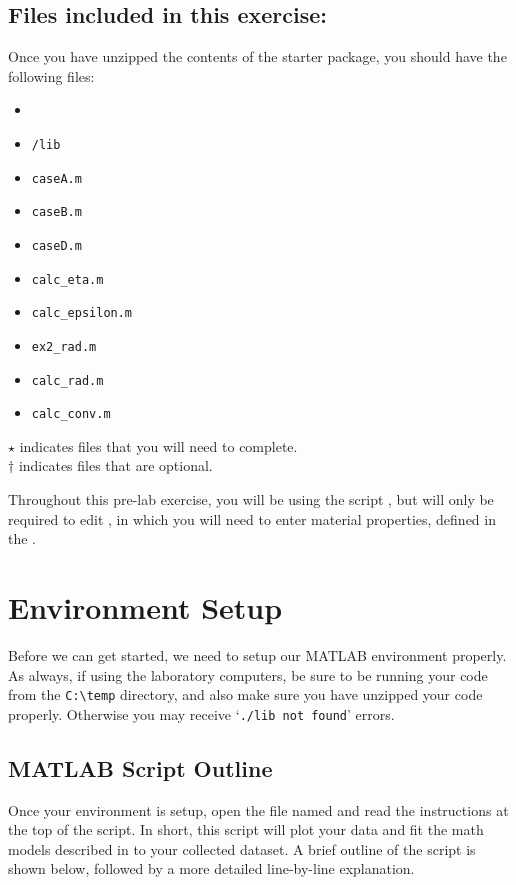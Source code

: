 \documentclass[11pt, letterpaper]{article}
\begin{document}
\subsection*{Files included in this exercise:}
Once you have unzipped the contents of the starter package, you should have the following files:

\begin{itemize}
\renewcommand\labelitemi{-- }
   \item {}
    \item \texttt{/lib}
    \item  \texttt{caseA.m}
\renewcommand\labelitemi{[$\star$]}
    \item \texttt{caseB.m}
    \item \texttt{caseD.m} 
    \item \texttt{calc\_eta.m} 
    \item \texttt{calc\_epsilon.m} 
\renewcommand\labelitemi{[$\dag$]}
    \item \texttt{ex2\_rad.m} 
    \item \texttt{calc\_rad.m}
    \item \texttt{calc\_conv.m}  
\end{itemize}

\noindent
$\star$ indicates files that you will need to complete.\\
$\dag$ indicates files that are optional.

\n
Throughout this pre-lab exercise, you will be using the script , but will only be required to edit , in which you will need to enter material properties, defined in the .


\setcounter{section}{-1}
\section{Environment Setup}
Before we can get started, we need to setup our MATLAB environment properly. As always, if using the laboratory computers, be sure to be running your code from the \texttt{C:\textbackslash temp} directory, and also make sure you have unzipped your code properly. Otherwise you may receive `\texttt{./lib not found}' errors.

\subsection{MATLAB Script Outline}

Once your environment is setup, open the file named  and read the instructions at the top of the script. In short, this script will plot your data and fit the math models described in  to your collected dataset. A brief outline of the script is shown below, followed by a more detailed line-by-line explanation.
\n
\end{document}
